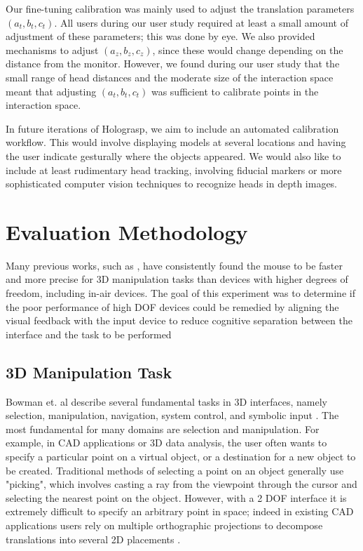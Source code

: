 \documentclass[pageno]{jpaper}
\begin{document}
Our fine-tuning calibration was mainly used to adjust the translation parameters $(a_t, b_t, c_t)$. All users during our user study required at least
a small amount of adjustment of these parameters; this was done by eye. We also provided mechanisms to adjust
$(a_z, b_z, c_z)$, since these would change depending on the distance from the monitor. However, we found during our user study that the small range of
head distances and the moderate size of the interaction space meant that adjusting $(a_t, b _t, c_t)$ was sufficient to calibrate points in the
interaction space.

In future iterations of Holograsp, we aim to include an automated calibration workflow. This would involve displaying models at several locations and
having the user indicate gesturally where the objects appeared. We would also like to include at least rudimentary head tracking, involving fiducial
markers or more sophisticated computer vision techniques to recognize heads in depth images.

\newpage
\section{Evaluation Methodology}
Many previous works, such as \cite{study1,mattheiss2011navigating,study2}, have consistently found the
mouse to be faster and more precise for 3D manipulation
tasks than devices with higher degrees of freedom, including in-air devices.
The goal of this experiment was to determine if the poor performance of high DOF devices could
be remedied by aligning the visual feedback with the input device to reduce cognitive separation between the interface and the task to be performed
\subsection{3D Manipulation Task}
Bowman et. al describe several fundamental tasks in 3D interfaces, namely selection,
manipulation, navigation, system control, and symbolic input \cite{3dui}. The most fundamental
for many domains are selection and manipulation. For example, in CAD applications or 3D data
analysis, the user often wants to specify a particular point on a virtual object, or a
destination for a new object to be created. Traditional methods of selecting a point on an
object generally use "picking", which involves casting a ray from the viewpoint through the
cursor and selecting the nearest point on the object\cite{study1}. However, with a 2 DOF
interface it is extremely difficult to specify an arbitrary point in space; indeed in existing
CAD applications users rely on multiple orthographic projections to decompose translations into
several 2D placements \cite{study2}.
\end{document}
